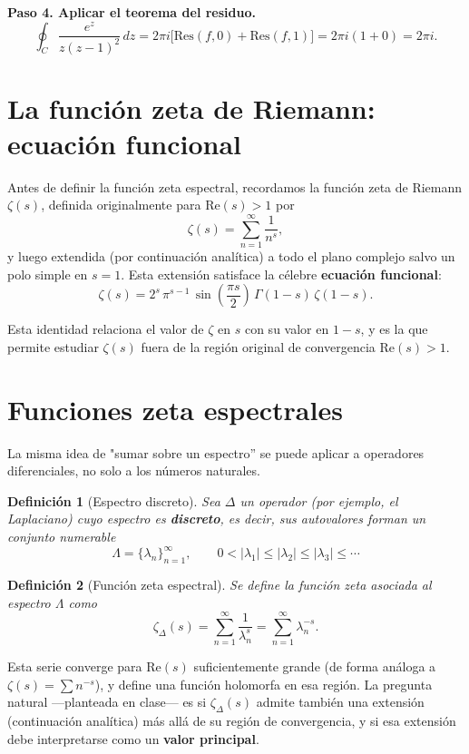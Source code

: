 \documentclass[12pt]{article}
\newtheorem{definicion}{Definición}
\begin{document}
\noindent \textbf{Paso 4. Aplicar el teorema del residuo.}
\[
\oint_C \frac{e^z}{z(z-1)^2}\,dz = 2\pi i \big[\mathrm{Res}(f,0) + \mathrm{Res}(f,1)\big] = 2\pi i (1 + 0) = \boxed{2\pi i}.
\]

\section{La función zeta de Riemann: ecuación funcional}

Antes de definir la función zeta espectral, recordamos la función zeta de Riemann $\zeta(s)$, definida originalmente para $\mathrm{Re}(s) > 1$ por
\[
\zeta(s) = \sum_{n=1}^{\infty} \frac{1}{n^s},
\]
y luego extendida (por continuación analítica) a todo el plano complejo salvo un polo simple en $s=1$. Esta extensión satisface la célebre \textbf{ecuación funcional}:
\[
\zeta(s) = 2^{s}\, \pi^{s-1} \, \sin\!\left(\frac{\pi s}{2}\right) \, \Gamma(1-s)\, \zeta(1-s).
\]

Esta identidad relaciona el valor de $\zeta$ en $s$ con su valor en $1-s$, y es la que permite estudiar $\zeta(s)$ fuera de la región original de convergencia $\mathrm{Re}(s)>1$.

\section{Funciones zeta espectrales}

La misma idea de "sumar sobre un espectro'' se puede aplicar a operadores diferenciales, no solo a los números naturales.

\begin{definicion}[Espectro discreto]
Sea $\Delta$ un operador (por ejemplo, el Laplaciano) cuyo espectro es \textbf{discreto}, es decir, sus autovalores forman un conjunto numerable
\[
\Lambda = \{\lambda_n\}_{n=1}^{\infty}, \qquad 0 < |\lambda_1| \leq |\lambda_2| \leq |\lambda_3| \leq \cdots
\]
\end{definicion}

\begin{definicion}[Función zeta espectral]
Se define la función zeta asociada al espectro $\Lambda$ como
\[
\zeta_{\Delta}(s) = \sum_{n=1}^{\infty} \frac{1}{\lambda_n^{s}} = \sum_{n=1}^{\infty} \lambda_n^{-s}.
\]
\end{definicion}

Esta serie converge para $\mathrm{Re}(s)$ suficientemente grande (de forma análoga a $\zeta(s) = \sum n^{-s}$), y define una función holomorfa en esa región. La pregunta natural —planteada en clase— es si $\zeta_\Delta(s)$ admite también una extensión (continuación analítica) más allá de su región de convergencia, y si esa extensión debe interpretarse como un \textbf{valor principal}.
\end{document}
